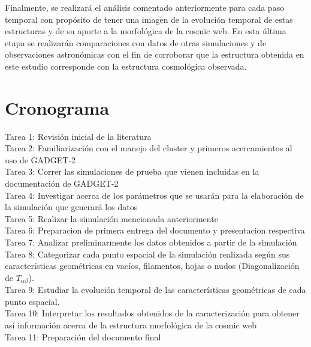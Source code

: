 \documentclass{article}
\begin{document}
Finalmente, se realizará el análisis comentado anteriormente para cada
paso temporal con propósito de tener una imagen de la evolución
temporal de estas estructuras y de su aporte a la morfológica de la
cosmic web. En esta última etapa se realizarán comparaciones con datos
de otras simulaciones y de observaciones astronómicas con el fin de
corroborar que la estructura obtenida en este estudio corresponde con
la estructura cosmológica observada.          



\section{Cronograma}

Tarea 1: Revisión inicial de la literatura \\ 
Tarea 2: Familiarización con el manejo del cluster y primeros
acercamientos al uso de GADGET-2 \\ 
Tarea 3: Correr las simulaciones de prueba que vienen incluidas en la
documentación de GADGET-2  \\ 
Tarea 4: Investigar acerca de los parámetros que se usarán para la elaboración de la simulación que generará los datos \\
Tarea 5: Realizar la simulación mencionada anteriormente \\
Tarea 6: Preparacion de primera entrega del documento y presentacion respectiva \\
Tarea 7: Analizar preliminarmente los datos obtenidos a partir de la
simulación \\ 
Tarea 8: Categorizar cada punto espacial de la simulación realizada
según sus características geométricas en vacíos, filamentos, hojas o
nudos (Diagonalización de $T_{\alpha\beta}$). \\ 
Tarea 9: Estudiar la evolución temporal de las características
geométricas de cada punto espacial. \\ 
Tarea 10: Interpretar los resultados obtenidos de la caracterización para obtener así información acerca de la estructura morfológica de la cosmic web \\
Tarea 11: Preparación del documento final \\
\end{document}
